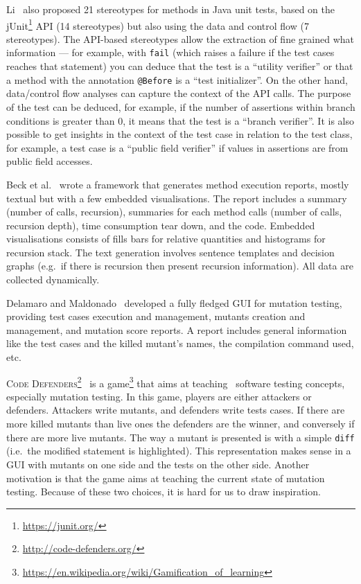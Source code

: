\documentclass[11pt]{sdm_internship}
\theoremstyle{definition}
\begin{document}
Li~\cite{li2018automatically} also proposed 21 stereotypes for methods in Java unit tests, based on the jUnit\footnote{\url{https://junit.org/}} API (14 stereotypes) but also using the data and control flow (7 stereotypes).
The API-based stereotypes allow the extraction of fine grained what information --- for example, with \texttt{fail} (which raises a failure if the test cases reaches that statement) you can deduce that the test is a ``utility verifier'' or that a method with the annotation \texttt{@Before} is a ``test initializer''.
On the other hand, data/control flow analyses can capture the context of the API calls.
The purpose of the test can be deduced, for example, if the number of assertions within branch conditions is greater than 0, it means that the test is a ``branch verifier''.
It is also possible to get insights in the context of the test case in relation to the test class, for example, a test case is a ``public field verifier'' if values in assertions are from public field accesses.

Beck et al.~\cite{beck2017method} wrote a framework that generates method execution reports, mostly textual but with a few embedded visualisations.
The report includes a summary (number of calls, recursion), summaries for each method calls (number of calls, recursion depth), time consumption tear down, and the code.
Embedded visualisations consists of fills bars for relative quantities and histograms for recursion stack.
The text generation involves sentence templates and decision graphs (e.g.\ if there is recursion then present recursion information).
All data are collected dynamically.

Delamaro and Maldonado~\cite{delamaro2001proteum} developed a fully fledged GUI for mutation testing, providing test cases execution and management, mutants creation and management, and mutation score reports.
A report includes general information like the test cases and the killed mutant's names, the compilation command used, etc.

\textsc{Code Defenders}\footnote{\url{http://code-defenders.org/}}~\cite{rojas2017code} is a game\footnote{\url{https://en.wikipedia.org/wiki/Gamification_of_learning}} that aims at teaching~\cite{clegg2017teaching} software testing concepts, especially mutation testing.
In this game, players are either attackers or defenders.
Attackers write mutants, and defenders write tests cases.
If there are more killed mutants than live ones the defenders are the winner, and conversely if there are more live mutants.
The way a mutant is presented is with a simple \texttt{diff} (i.e.\ the modified statement is highlighted).
This representation makes sense in a GUI with mutants on one side and the tests on the other side.
Another motivation is that the game aims at teaching the current state of mutation testing.
Because of these two choices, it is hard for us to draw inspiration.
\end{document}

